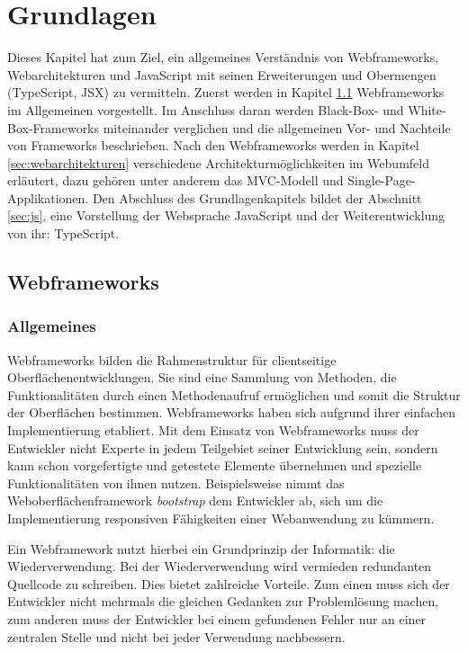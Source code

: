 
\chapter{Grundlagen}

Dieses Kapitel hat zum Ziel, ein allgemeines Verständnis von Webframeworks, Webarchitekturen und JavaScript mit seinen Erweiterungen und Obermengen (TypeScript, JSX) zu vermitteln. Zuerst werden in Kapitel \ref{sec:webframeworks} Webframeworks im Allgemeinen vorgestellt. Im Anschluss daran werden Black-Box- und White-Box-Frameworks miteinander verglichen und die allgemeinen Vor- und Nachteile von Frameworks beschrieben. Nach den Webframeworks werden in Kapitel \ref{sec:webarchitekturen} verschiedene Architekturmöglichkeiten im Webumfeld erläutert, dazu gehören unter anderem das MVC-Modell und Single-Page-Applikationen. Den Abschluss des Grundlagenkapitels bildet der Abschnitt \ref{sec:js}, eine Vorstellung der Websprache JavaScript und der Weiterentwicklung von ihr: TypeScript. 

\section{Webframeworks}\label{sec:webframeworks}

\subsection{Allgemeines}

Webframeworks bilden die Rahmenstruktur für clientseitige Oberflächenentwicklungen. Sie sind eine Sammlung von Methoden, die Funktionalitäten durch einen Methodenaufruf ermöglichen und somit die Struktur der Oberflächen bestimmen. Webframeworks haben sich aufgrund ihrer einfachen Implementierung etabliert. Mit dem Einsatz von Webframeworks muss der Entwickler nicht Experte in jedem Teilgebiet seiner Entwicklung sein, sondern kann schon vorgefertigte und getestete Elemente übernehmen und spezielle Funktionalitäten von ihnen nutzen. Beispielsweise nimmt das Weboberflächenframework \textit{bootstrap} dem Entwickler ab, sich um die Implementierung responsiven Fähigkeiten einer Webanwendung zu kümmern.\autocites[vgl.][312\psqq]{Schatten2010}

Ein Webframework nutzt hierbei ein Grundprinzip der Informatik: die Wiederverwendung. Bei der Wiederverwendung wird vermieden redundanten Quellcode zu schreiben. Dies bietet zahlreiche Vorteile. Zum einen muss sich der Entwickler nicht mehrmals die gleichen Gedanken zur Problemlösung machen, zum anderen muss der Entwickler bei einem gefundenen Fehler nur an einer zentralen Stelle und nicht bei jeder Verwendung nachbessern.\autocites[vgl.][302\psqq]{Schatten2010}

